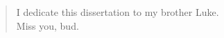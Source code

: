 \vspace*{\fill}
\vspace*{-2in}
\begin{quote}
    \center
    I dedicate this dissertation to my brother Luke. \\
    Miss you, bud.
\end{quote}
\vspace*{\fill}
